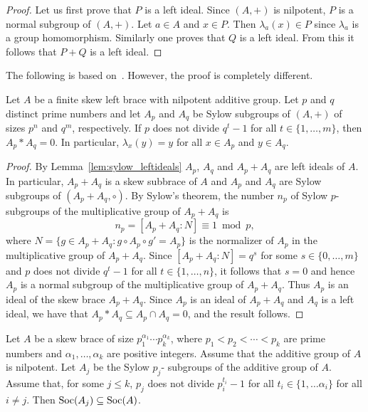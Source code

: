 \begin{proof}
    Let us first prove that $P$ is a left ideal. Since $(A,+)$ is nilpotent,
    $P$ is a normal subgroup of $(A,+)$. Let $a\in A$ and $x\in P$. Then
    $\lambda_a(x)\in P$ since $\lambda_a$ is a group homomorphism. Similarly
    one proves that $Q$ is a left ideal. From this it follows that $P+Q$ is a
    left ideal.
\end{proof}

The following is based on~\cite[Theorem 5(1)]{MR3765444}.
However, the proof is completely different.

\begin{theorem}
\label{thm:P*Q=0} Let $A$ be a finite skew left brace with nilpotent
additive group. Let $p$ and $q$ distinct prime numbers and let $A_p$
and $A_q$ be Sylow subgroups of $(A,+)$ of sizes $p^n$ and $q^m$,
respectively. If $p$ does not divide $q^t-1$ for all
$t\in\{1,\dots,m\}$, then $A_p*A_q=0$. In particular,
$\lambda_x(y)=y$ for all $x\in A_p$ and $y\in A_q$.
\end{theorem}

\begin{proof}
By Lemma~\ref{lem:sylow_leftideals} $A_p$, $A_q$ and $A_p+A_q$
are left ideals of $A$. In particular,  $A_p+A_q$ is a skew subbrace
of $A$ and $A_p$ and $A_q$ are Sylow subgroups of
$(A_p+A_q,\circ)$. By Sylow's theorem, the number $n_p$ of Sylow
$p$-subgroups of the multiplicative group of $A_p+A_q$ is
\[
n_p=[A_p+A_q:N]\equiv 1\bmod p,
\]
where $N=\{g\in A_p+A_q:g\circ A_p\circ g'=A_p\}$ is the normalizer
of $A_p$ in the multiplicative group of $A_p+A_q$. Since
$[A_p+A_q:N]=q^s$ for some $s\in\{0,\dots,m\}$ and $p$ does not
divide $q^t-1$ for all $t\in\{1,\dots,n\}$, it follows that $s=0$
and hence $A_p$ is a normal subgroup of the multiplicative group of
$A_p+A_q$. Thus $A_p$ is an ideal of the skew brace
$A_p+A_q$. Since $A_p$ is an ideal of $A_p+A_q$ and $A_q$ is a left
ideal, we have that $A_p*A_q\subseteq A_p\cap A_q=0$, and the result
follows.
\end{proof}


\begin{corollary}
Let $A$ be a skew  brace of size $p_1^{\alpha_1}\cdots
p_k^{\alpha_k}$, where $p_1<p_2<\cdots<p_k$ are prime numbers and
$\alpha_1,\dots,\alpha_k$ are positive integers. Assume that the
additive group of $A$ is nilpotent. Let $A_j$ be the Sylow $p_j$-
subgroups of the additive group of $A$. Assume that, for some $j\leq k$,
$p_j$ does not divide $p_i^{t_i}-1$ for all $t_i\in\{
1,\dots \alpha_i\}$ for all $i\neq j$. Then $\operatorname{Soc}(A_j)\subseteq
\operatorname{Soc}(A)$.
\end{corollary}

